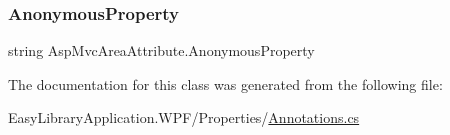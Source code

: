 \subsubsection{\texorpdfstring{Anonymous\+Property}{AnonymousProperty}}
{\footnotesize\ttfamily string Asp\+Mvc\+Area\+Attribute.\+Anonymous\+Property\hspace{0.3cm}{\ttfamily [get]}}



The documentation for this class was generated from the following file\+:\begin{DoxyCompactItemize}
\item 
Easy\+Library\+Application.\+W\+P\+F/\+Properties/\mbox{\hyperlink{_annotations_8cs}{Annotations.\+cs}}\end{DoxyCompactItemize}
